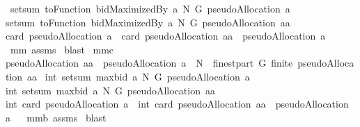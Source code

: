 \begin{isabellebody}
\ {\isachardoublequoteopen}setsum\ {\isacharparenleft}toFunction\ {\isacharparenleft}bidMaximizedBy\ a\ N\ G{\isacharparenright}{\isacharparenright}\ {\isacharparenleft}pseudoAllocation\ a{\isacharparenright}\ {\isacharminus}\ \isanewline
{\isacharparenleft}setsum\ {\isacharparenleft}toFunction\ {\isacharparenleft}bidMaximizedBy\ a\ N\ G{\isacharparenright}{\isacharparenright}\ {\isacharparenleft}pseudoAllocation\ aa{\isacharparenright}{\isacharparenright}\ {\isacharequal}\ \isanewline
card\ {\isacharparenleft}pseudoAllocation\ a{\isacharparenright}\ {\isacharminus}\ card\ {\isacharparenleft}pseudoAllocation\ aa\ {\isasyminter}\ {\isacharparenleft}pseudoAllocation\ a{\isacharparenright}{\isacharparenright}{\isachardoublequoteclose}%
\isadelimproof
\ %
\endisadelimproof
%
\isatagproof
{}\isamarkupfalse%
\ mm{}{}\ assms\isanewline
{}\isamarkupfalse%
\ blast%
\endisatagproof
{\isafoldproof}%
%
\isadelimproof
%
\endisadelimproof
\isanewline
\isanewline
{}\isamarkupfalse%
\ mm{}{}c{\isacharcolon}\ \ \isanewline
{\isachardoublequoteopen}pseudoAllocation\ aa\ {\isasymsubseteq}\ pseudoAllocation\ a\ {\isasymunion}\ {\isacharparenleft}N\ {\isasymtimes}\ {\isacharparenleft}finestpart\ G{\isacharparenright}{\isacharparenright}{\isachardoublequoteclose}\ {\isachardoublequoteopen}finite\ {\isacharparenleft}pseudoAllocation\ aa{\isacharparenright}{\isachardoublequoteclose}\isanewline
{}\ {\isachardoublequoteopen}int\ {\isacharparenleft}setsum\ {\isacharparenleft}maxbid{\isacharprime}\ a\ N\ G{\isacharparenright}\ {\isacharparenleft}pseudoAllocation\ a{\isacharparenright}{\isacharparenright}\ {\isacharminus}\ \isanewline
int\ {\isacharparenleft}setsum\ {\isacharparenleft}maxbid{\isacharprime}\ a\ N\ G{\isacharparenright}\ {\isacharparenleft}pseudoAllocation\ aa{\isacharparenright}{\isacharparenright}\ {\isacharequal}\ \isanewline
int\ {\isacharparenleft}card\ {\isacharparenleft}pseudoAllocation\ a{\isacharparenright}{\isacharparenright}\ {\isacharminus}\ int\ {\isacharparenleft}card\ {\isacharparenleft}pseudoAllocation\ aa\ {\isasyminter}\ {\isacharparenleft}pseudoAllocation\ a{\isacharparenright}{\isacharparenright}{\isacharparenright}{\isachardoublequoteclose}%
\isadelimproof
\ %
\endisadelimproof
%
\isatagproof
{}\isamarkupfalse%
\ mm{}{}b\ assms\isanewline
{}\isamarkupfalse%
\ blast%
\endisatagproof
{\isafoldproof}%
%
\isadelimproof
%
\endisadelimproof
\isanewline

\end{isabellebody}

